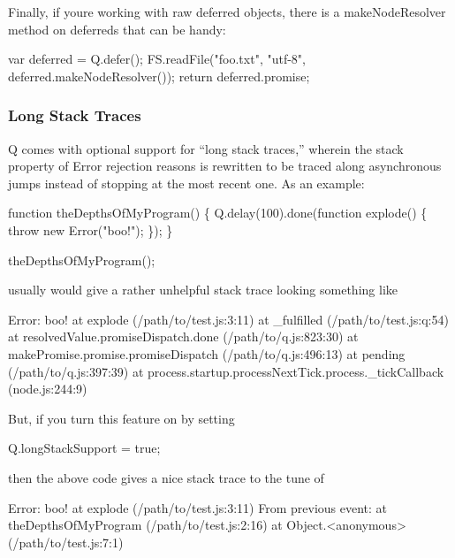 Finally, if you\textquotesingle{}re working with raw deferred objects, there is a {\ttfamily make\+Node\+Resolver} method on deferreds that can be handy\+:


\begin{DoxyCode}
var deferred = Q.defer();
FS.readFile("foo.txt", "utf-8", deferred.makeNodeResolver());
return deferred.promise;
\end{DoxyCode}


\subsubsection*{Long Stack Traces}

Q comes with optional support for “long stack traces,” wherein the {\ttfamily stack} property of {\ttfamily Error} rejection reasons is rewritten to be traced along asynchronous jumps instead of stopping at the most recent one. As an example\+:


\begin{DoxyCode}
function theDepthsOfMyProgram() \{
  Q.delay(100).done(function explode() \{
    throw new Error("boo!");
  \});
\}

theDepthsOfMyProgram();
\end{DoxyCode}


usually would give a rather unhelpful stack trace looking something like


\begin{DoxyCode}
Error: boo!
    at explode (/path/to/test.js:3:11)
    at \_fulfilled (/path/to/test.js:q:54)
    at resolvedValue.promiseDispatch.done (/path/to/q.js:823:30)
    at makePromise.promise.promiseDispatch (/path/to/q.js:496:13)
    at pending (/path/to/q.js:397:39)
    at process.startup.processNextTick.process.\_tickCallback (node.js:244:9)
\end{DoxyCode}


But, if you turn this feature on by setting


\begin{DoxyCode}
Q.longStackSupport = true;
\end{DoxyCode}


then the above code gives a nice stack trace to the tune of


\begin{DoxyCode}
Error: boo!
    at explode (/path/to/test.js:3:11)
From previous event:
    at theDepthsOfMyProgram (/path/to/test.js:2:16)
    at Object.<anonymous> (/path/to/test.js:7:1)
\end{DoxyCode}


